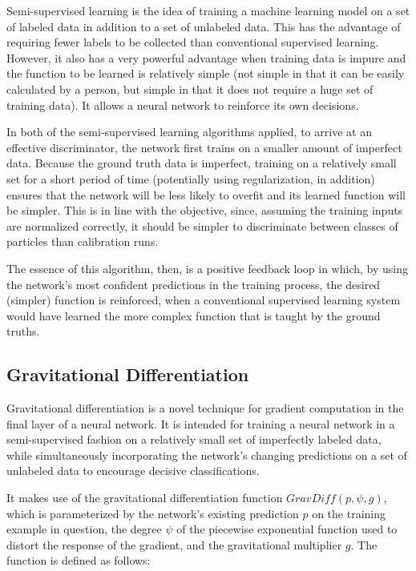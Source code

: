 \documentclass[10pt]{article}
\begin{document}
Semi-supervised learning is the idea of training a machine learning model on a set of labeled data in addition to a set of unlabeled data. This has the advantage of requiring fewer labels to be collected than conventional supervised learning. However, it also has a very powerful advantage when training data is impure and the function to be learned is relatively simple (not simple in that it can be easily calculated by a person, but simple in that it does not require a huge set of training data). It allows a neural network to reinforce its own decisions.

In both of the semi-supervised learning algorithms applied, to arrive at an effective discriminator, the network first trains on a smaller amount of imperfect data. Because the ground truth data is imperfect, training on a relatively small set for a short period of time (potentially using regularization, in addition) ensures that the network will be less likely to overfit and its learned function will be simpler. This is in line with the objective, since, assuming the training inputs are normalized correctly, it should be simpler to discriminate between classes of particles than calibration runs.

The essence of this algorithm, then, is a positive feedback loop in which, by using the network's most confident predictions in the training process, the desired (simpler) function is reinforced, when a conventional supervised learning system would have learned the more complex function that is taught by the ground truths.

\subsection{Gravitational Differentiation}

Gravitational differentiation is a novel technique for gradient computation in the final layer of a neural network. It is intended for training a neural network in a semi-supervised fashion on a relatively small set of imperfectly labeled data, while simultaneously incorporating the network's changing predictions on a set of unlabeled data to encourage decisive classifications.

It makes use of the gravitational differentiation function $GravDiff(p, \psi, g)$, which is parameterized by the network's existing prediction $p$ on the training example in question, the degree $\psi$ of the piecewise exponential function used to distort the response of the gradient, and the gravitational multiplier $g$. The function is defined as follows:
\end{document}
